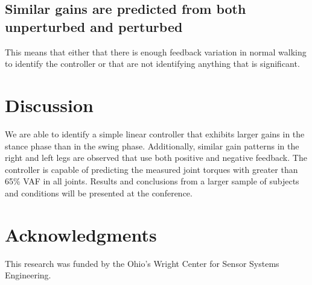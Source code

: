 \documentclass{article}
\begin{document}
\subsection*{Similar gains are predicted from both unperturbed and perturbed}
%
This means that either that there is enough feedback variation in normal
walking to identify the controller or that are not identifying anything that is
significant.

\section*{Discussion}
%
We are able to identify a simple linear controller that exhibits larger gains
in the stance phase than in the swing phase. Additionally, similar gain
patterns in the right and left legs are observed that use both positive and
negative feedback. The controller is capable of predicting the measured joint
torques with greater than 65\% VAF in all joints. Results and conclusions from
a larger sample of subjects and conditions will be presented at the conference.

\section*{Acknowledgments}

This research was funded by the Ohio's Wright Center for Sensor Systems
Engineering.
\end{document}

